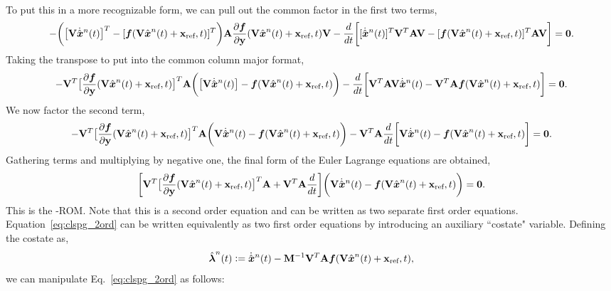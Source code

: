 \documentclass[3p,computermodern,10pt]{elsarticle}
\begin{document}
\begin{appendices}
\begin{multline*}
\end{multline*}
To put this in a more recognizable form, we can pull out the common factor in the first two terms,
$$ - \bigg( \big[ \basisspace \genstateDotArg{n}{t} \big]^T  -  [\velocity(\veloargsromn)] ^T \bigg) \stweightingMatArg{n}
 \frac{\partial \velocity}{\partial \stateyDiscrete}(\veloargsromn) \basisspace - \frac{d}{dt} \bigg[  [\genstateDotArg{n}{t}]^T \basisspace^T \stweightingMatArg{n} \basisspace -  
[\velocity(\veloargsromn) ]^T \stweightingMatArg{n} \basisspace  \bigg] = \boldsymbol 0.$$
Taking the transpose to put into the common column major format,
$$ -  \basisspace^T \big[ \frac{\partial \velocity}{\partial \stateyDiscrete}(\veloargsromn)  \big]^T \stweightingMatArg{n} \bigg( \big[ \basisspace \genstateDotArg{n}{t}\big]  -  \velocity(\veloargsromn)  \bigg) -  \frac{d}{dt} \bigg[  \basisspace^T \stweightingMatArg{n} \basisspace \genstateDotArg{n}{t}  - \basisspace^T \stweightingMatArg{n} \velocity(\veloargsromn)   \bigg] = \bz.
 $$
We now factor the second term,
$$ -  \basisspace^T \big[ \frac{\partial \velocity}{\partial \stateyDiscrete}(\veloargsromn)  \big]^T \stweightingMatArg{n} \bigg(  \basisspace \genstateDotArg{n}{t}  -  \velocity(\veloargsromn) \bigg) -  \basisspace^T \stweightingMatArg{n} \frac{d}{dt} \bigg[   \basisspace \genstateDotArg{n}{t}  - \velocity(\veloargsromn) \bigg] = \bz. $$
Gathering terms and multiplying by negative one, the final form of the Euler Lagrange equations are obtained,
$$ \bigg[\basisspace^T \big[\frac{\partial \velocity}{\partial \stateyDiscrete}(\veloargsromn) \big]^T \stweightingMatArg{n} + \basisspace^T \stweightingMatArg{n} \frac{d}{dt} \bigg] \bigg(  \basisspace \genstateDotArg{n}{t} -  \velocity(\veloargsromn) \bigg) = \bz. $$
This is the \methodAcronym-ROM. Note that this is a second order equation and can be written as two separate first order equations. Equation~\ref{eq:clspg_2ord} can be written equivalently as two first order equations by introducing an auxiliary ``costate" variable. Defining the costate as,
\begin{equation*}
\adjoint^n(t) \defeq  \genstateDotArg{n}{t}  -  \mass^{-1} \basisspace^T \stweightingMatArg{n} \velocity(\veloargsromn) ,
\end{equation*}
we can manipulate Eq.~\ref{eq:clspg_2ord} as follows: %

\end{appendices}
\end{document}
